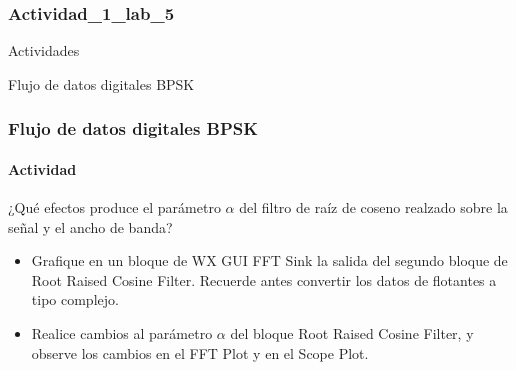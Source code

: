 \subsubsection{Actividad_1_lab_5}

\begin{frame}

\begin{block}{}
\centering
\vspace{8mm}
\Large{Actividades}
\vspace{8mm}
\end{block}
\end{frame}

\begin{frame}{Flujo de datos digitales BPSK}

\frametitle{Flujo de datos digitales BPSK}
\framesubtitle{Actividad}
¿Qué efectos produce el parámetro $\alpha$ del filtro de raíz de coseno realzado sobre la señal y el ancho de banda?\\
\begin{itemize}
\item Grafique en un bloque de WX GUI FFT Sink la salida del segundo bloque de Root Raised Cosine Filter. Recuerde antes convertir los datos de flotantes a tipo complejo.     
\item Realice cambios al parámetro $\alpha$ del bloque Root Raised Cosine Filter, y observe los cambios en el FFT Plot y en el Scope Plot.
\end{itemize}

\end{frame}
